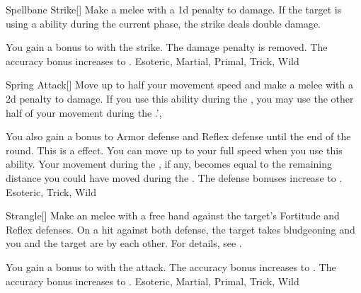 \lowercase{\hypertarget{maneuver:Spellbane Strike}{}}\label{maneuver:Spellbane Strike}
\hypertarget{maneuver:Spellbane Strike}{}
\begin{freeability}[Rank 1]{Spellbane Strike}[]
Make a melee  with a \minus1d penalty to damage.
If the target is using a  ability during the current phase, the strike deals double damage.

\rankline
{} You gain a  bonus to  with the strike.
 The damage penalty is removed.
 The accuracy bonus increases to .
 Esoteric, Martial, Primal, Trick, Wild
\end{freeability}
\vspace{0.25em}



\lowercase{\hypertarget{maneuver:Spring Attack}{}}\label{maneuver:Spring Attack}
\hypertarget{maneuver:Spring Attack}{}
\begin{freeability}[Rank 1]{Spring Attack}[]
Move up to half your movement speed and make a melee  with a \minus2d penalty to damage.
If you use this ability during the , you may use the other half of your movement during the .',

\rankline
{} You also gain a  bonus to Armor defense and Reflex defense until the end of the round. This is a  effect.
 You can move up to your full speed when you use this ability.
Your movement during the , if any, becomes equal to the remaining distance you could have moved during the .
 The defense bonuses increase to .
 Esoteric, Trick, Wild
\end{freeability}
\vspace{0.25em}



\lowercase{\hypertarget{maneuver:Strangle}{}}\label{maneuver:Strangle}
\hypertarget{maneuver:Strangle}{}
\begin{freeability}[Rank 1]{Strangle}[]
Make an melee  with a free hand against the target's Fortitude and Reflex defenses.
On a hit against both defense, the target takes bludgeoning  and you and the target are  by each other.
For details, see .

\rankline
{} You gain a  bonus to  with the attack.
 The accuracy bonus increases to .
 The accuracy bonus increases to .
 Esoteric, Martial, Primal, Trick, Wild
\end{freeability}
\vspace{0.25em}



